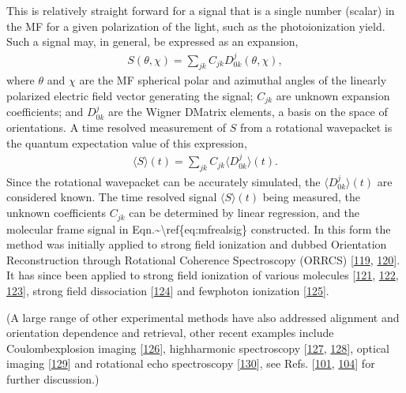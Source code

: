 \documentclass[letterpaper,table,10pt,english]{jupyterBook}
\begin{document}
\sphinxAtStartPar
This is relatively straight forward for a signal that is a single number (scalar) in the MF for a given polarization of the light, such as the photoionization yield. Such a signal may, in general, be expressed as an expansion,
\begin{equation}\label{equation:part1/numerics_070723:eq:mfrealsig}
\begin{split}
S(\theta,\chi)=\sum_{jk}C_{jk}D^{j}_{0k}(\theta,\chi),
\end{split}
\end{equation}
\sphinxAtStartPar
where \(\theta\) and \(\chi\) are the MF spherical polar and azimuthal angles of the linearly polarized electric field vector generating the signal; \(C_{jk}\) are unknown expansion coefficients; and \(D^{j}_{0k}\) are the Wigner D\sphinxhyphen{}Matrix elements, a basis on the space of orientations. A time resolved measurement of \(S\) from a rotational wavepacket is the quantum expectation value of this expression,
\begin{equation}\label{equation:part1/numerics_070723:eq:St-Cjk}
\begin{split}
\langle S \rangle(t) = \sum_{jk}C_{jk}\langle D^{j}_{0k} \rangle (t).
\end{split}
\end{equation}
\sphinxAtStartPar
Since the rotational wavepacket can be accurately simulated, the \(\langle D^{j}_{0k} \rangle (t)\) are considered known. The time resolved signal \(\langle S \rangle(t)\) being measured, the unknown coefficients \(C_{jk}\) can be determined by linear regression, and the molecular frame signal in Eqn.\textasciitilde{}\textbackslash{}ref\{eq:mfrealsig\} constructed. In this form the method was initially applied to strong field ionization and dubbed Orientation Reconstruction through Rotational Coherence Spectroscopy (ORRCS) {[}\hyperlink{cite.backmatter/bibliography:id974}{119}, \hyperlink{cite.backmatter/bibliography:id973}{120}{]}.
It has since been applied to strong field ionization of various molecules {[}\hyperlink{cite.backmatter/bibliography:id975}{121}, \hyperlink{cite.backmatter/bibliography:id976}{122}, \hyperlink{cite.backmatter/bibliography:id979}{123}{]},
strong field dissociation {[}\hyperlink{cite.backmatter/bibliography:id978}{124}{]} and few\sphinxhyphen{}photon ionization {[}\hyperlink{cite.backmatter/bibliography:id977}{125}{]}.

\sphinxAtStartPar
(A large range of other experimental methods have also addressed alignment and orientation dependence and retrieval, other recent examples include Coulomb\sphinxhyphen{}explosion imaging {[}\hyperlink{cite.backmatter/bibliography:id918}{126}{]}, high\sphinxhyphen{}harmonic spectroscopy {[}\hyperlink{cite.backmatter/bibliography:id635}{127}, \hyperlink{cite.backmatter/bibliography:id636}{128}{]}, optical imaging {[}\hyperlink{cite.backmatter/bibliography:id743}{129}{]} and rotational echo spectroscopy {[}\hyperlink{cite.backmatter/bibliography:id932}{130}{]}, see Refs. {[}\hyperlink{cite.backmatter/bibliography:id711}{101}, \hyperlink{cite.backmatter/bibliography:id816}{104}{]} for further discussion.)
\end{document}
